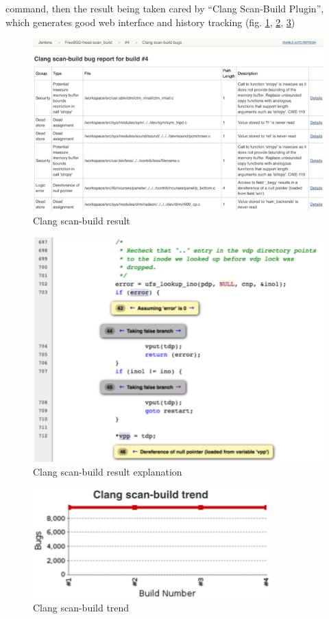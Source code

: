 \documentclass[a4paper,twocolumn,10pt]{article}
\begin{document}
command, then the result being taken cared by ``Clang Scan-Build Plugin'',
which generates good web interface and history tracking (fig.
\ref{scan-build-result}, \ref{scan-build-path}, \ref{clang-scan-build-trend})

\begin{figure}
\includegraphics[width=\textwidth]{scan-build-result.png}
\caption{Clang scan-build result}
\label{scan-build-result}
\end{figure}

\begin{figure}
\includegraphics[width=\textwidth]{scan-build-path.png}
\caption{Clang scan-build result explanation}
\label{scan-build-path}
\end{figure}

\begin{figure}
\includegraphics{clang-scan-build-trend.png}
\caption{Clang scan-build trend}
\label{clang-scan-build-trend}
\end{figure}
\end{document}
